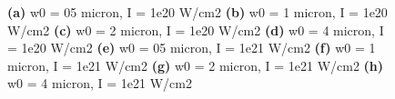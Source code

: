 \begin{figure}[h!]
	\caption{\textbf{(a)} w0 = 05 micron, I = 1e20 W/cm2 \textbf{(b)} w0 = 1 micron, I = 1e20 W/cm2 \textbf{(c)} w0 = 2 micron, I = 1e20 W/cm2 \textbf{(d)} w0 = 4 micron, I = 1e20 W/cm2 \textbf{(e)} w0 = 05 micron, I = 1e21 W/cm2 \textbf{(f)} w0 = 1 micron, I = 1e21 W/cm2 \textbf{(g)} w0 = 2 micron, I = 1e21 W/cm2 \textbf{(h)} w0 = 4 micron, I = 1e21 W/cm2}
	\label{}
\end{figure}

